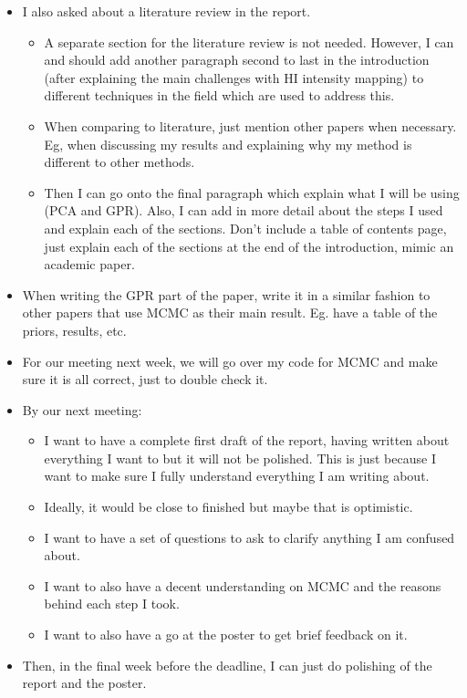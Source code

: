 \begin{itemize}
\begin{itemize}
\end{itemize}
\item I also asked about a literature review in the report.
\begin{itemize}
    \item A separate section for the literature review is not needed. However, I can and should add another paragraph second to last in the introduction (after explaining the main challenges with HI intensity mapping) to different techniques in the field which are used to address this. 
    \item When comparing to literature, just mention other papers when necessary. Eg, when discussing my results and explaining why my method is different to other methods. 
    \item Then I can go onto the final paragraph which explain what I will be using (PCA and GPR). Also, I can add in more detail about the steps I used and explain each of the sections. Don't include a table of contents page, just explain each of the sections at the end of the introduction, mimic an academic paper.
\end{itemize}
\item When writing the GPR part of the paper, write it in a similar fashion to other papers that use MCMC as their main result. Eg. have a table of the priors, results, etc. 
\item For our meeting next week, we will go over my code for MCMC and make sure it is all correct, just to double check it.
\item By our next meeting:
\begin{itemize}
    \item I want to have a complete first draft of the report, having written about everything I want to but it will not be polished. This is just because I want to make sure I fully understand everything I am writing about.
    \item Ideally, it would be close to finished but maybe that is optimistic.
    \item I want to have a set of questions to ask to clarify anything I am confused about. 
    \item I want to also have a decent understanding on MCMC and the reasons behind each step I took.
    \item I want to also have a go at the poster to get brief feedback on it.
\end{itemize}
\item Then, in the final week before the deadline, I can just do polishing of the report and the poster.
\end{itemize}